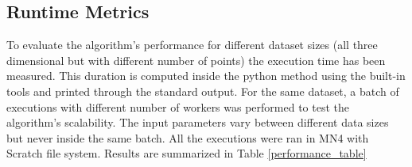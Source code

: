 \documentclass[10pt,journal,compsoc]{IEEEtran}
\begin{document}
\subsection{Runtime Metrics} \label{subsec:metrics}

To evaluate the algorithm's performance for different dataset sizes (all three dimensional but with different number of points) the execution time has been measured. This duration is computed inside the python method using the built-in tools and printed through the standard output. For the same dataset, a batch of executions with different number of workers was performed to test the algorithm's scalability. The input parameters vary between different data sizes but never inside the same batch. All the executions were ran in MN4  with Scratch file system. Results are summarized in Table \ref{performance_table}
\end{document}
